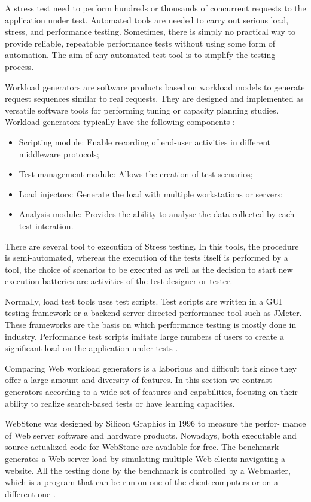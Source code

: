 A stress test need to perform hundreds or thousands of concurrent requests  to the application under test. Automated tools are needed to carry out serious load, stress, and performance testing. Sometimes, there is simply no practical way to provide reliable, repeatable performance tests without using some form of automation. The aim of any automated test tool is to simplify the testing process. 

Workload generators are software products based on workload models to generate request sequences similar to real requests. They are designed and implemented as versatile software tools for performing tuning or capacity planning studies. Workload generators typically have the following components \cite{Molyneaux2009}:

\begin{itemize}
\item Scripting module: Enable recording of end-user activities in different middleware protocols;
\item Test management module: Allows the creation of test scenarios;
\item Load injectors: Generate the load with multiple workstations or servers;
\item Analysis module: Provides the ability to analyse the data collected by each test interation.
\end{itemize}


There are several tool to execution of Stress testing. In this tools, the procedure is semi-automated, whereas the execution of the tests itself is performed by a tool, the choice of scenarios to be executed as well as the decision to start new execution batteries are activities of the test designer or tester.

Normally, load test tools uses test scripts. Test scripts are written in a GUI testing framework or a backend server-directed performance tool such as JMeter. These frameworks are the basis on which performance testing is mostly done in industry. Performance test scripts imitate large numbers of users to create a significant load on the application under tests \cite{Grechanik2012}.

Comparing Web workload generators is a laborious and difficult task since they offer a large amount and diversity of features. In this section we contrast generators according to a wide set of features and capabilities, focusing on their ability to realize search-based tests or have learning capacities.

WebStone was designed by Silicon Graphics in 1996 to measure the perfor- mance of Web server software and hardware products. Nowadays, both executable and source actualized code for WebStone are available for free. The benchmark generates a Web server load by simulating multiple Web clients navigating a website. All the testing done by the benchmark is controlled by a Webmaster, which is a program that can be run on one of the client computers or on a different one \cite{MohammadS.Obaidat} \cite{Trent1995} . 

